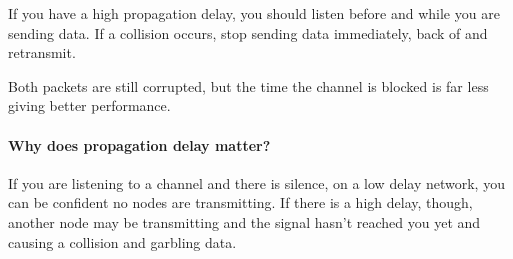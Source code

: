 If you have a high propagation delay, you should listen before and while you are sending data.
If a collision occurs, stop sending data immediately, back of and retransmit.

\begin{note}
	Both packets are still corrupted, but the time the channel is blocked is far less giving better performance.
\end{note}

\paragraph{Why does propagation delay matter?}\label{par:why_does_propagation_delay_matter_}

If you are listening to a channel and there is silence, on a low delay network, you can be confident no nodes are transmitting.
If there is a high delay, though, another node may be transmitting and the signal hasn't reached you yet and causing a collision and garbling data.
